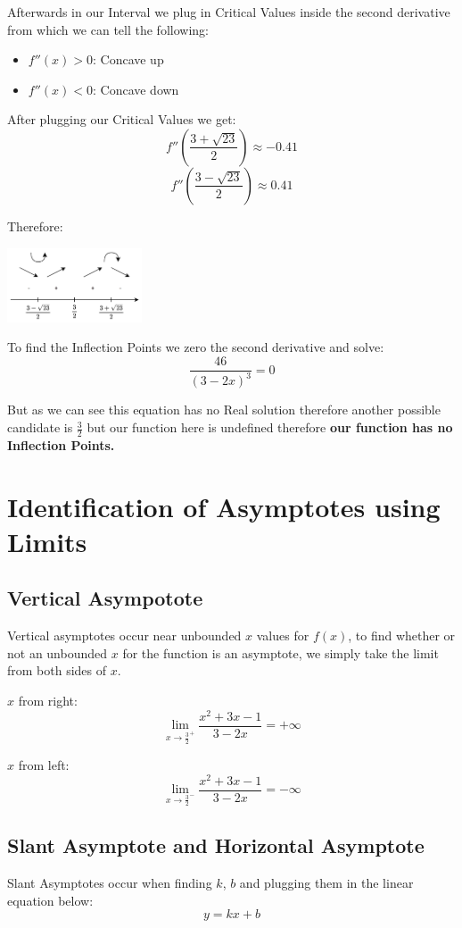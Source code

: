 \documentclass[11pt]{article}
\begin{document}
Afterwards in our Interval we plug in Critical Values inside the second derivative from which we can tell the following:
\begin{itemize}
\item \(f''(x) > 0\): Concave up
\item \(f''(x) < 0\): Concave down
\end{itemize}

After plugging our Critical Values we get:
\[
f''\left(\frac{3+\sqrt{23}}{2}\right) \approx -0.41
\]
\[
f''\left(\frac{3-\sqrt{23}}{2}\right) \approx 0.41
\]

\newpage
Therefore:
\begin{center}
\includegraphics[width=0.3\textwidth]{./skarmbild2.png}
\end{center}

To find the Inflection Points we zero the second derivative and solve:
\[
\frac{46}{(3-2x)^3} = 0
\]

But as we can see this equation has no Real solution therefore another possible candidate is \(\frac{3}{2}\) but our function here is undefined therefore \textbf{our function has no Inflection Points.}
\section{Identification of Asymptotes using Limits}
\label{sec:orgff4b913}
\subsection{Vertical Asympotote}
\label{sec:org757784c}
Vertical asymptotes occur near unbounded \(x\) values for \(f(x)\), to find whether or not an unbounded \(x\) for the function is an asymptote, we simply take the limit from both sides of \(x\).

\(x\) from right:
\[
\lim_{x\to\frac{3}{2}^+} \frac{x^2+3x-1}{3-2x} = +\infty
\]

\(x\) from left:
\[
\lim_{x\to\frac{3}{2}^-} \frac{x^2+3x-1}{3-2x} = -\infty
\]
\subsection{Slant Asymptote and Horizontal Asymptote}
\label{sec:orge886423}
Slant Asymptotes occur when finding \(k\), \(b\) and plugging them in the linear equation below:
\[
y=kx+b
\]
\end{document}
